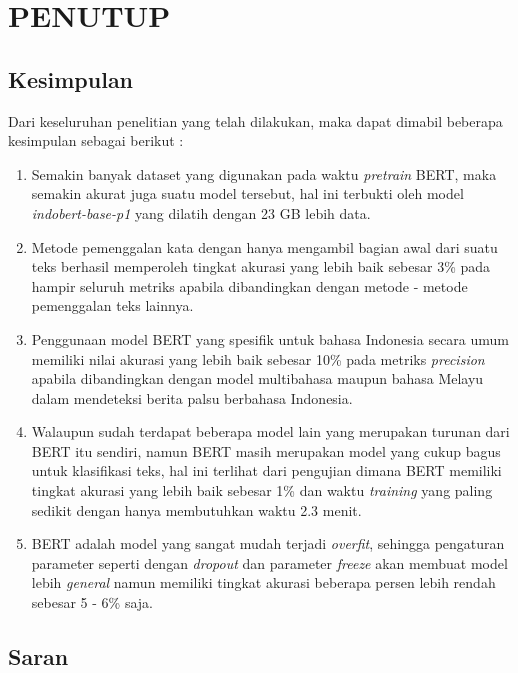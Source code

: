\chapter{PENUTUP}
\label{chap:penutup}


\section{Kesimpulan}
\label{sec:kesimpulan}

Dari keseluruhan penelitian yang telah dilakukan, maka dapat dimabil beberapa kesimpulan sebagai berikut :

\begin{enumerate}[nolistsep]

  \item Semakin banyak dataset yang digunakan pada waktu \textit{pretrain} BERT, maka semakin akurat juga suatu model tersebut, hal ini terbukti oleh model \textit{indobert-base-p1} yang dilatih dengan 23 GB lebih data.
  \item Metode pemenggalan kata dengan hanya mengambil bagian awal dari suatu teks berhasil memperoleh tingkat akurasi yang lebih baik sebesar 3\% pada hampir seluruh metriks apabila dibandingkan dengan metode - metode pemenggalan teks lainnya.
  \item Penggunaan model BERT yang spesifik untuk bahasa Indonesia secara umum memiliki nilai akurasi yang lebih baik sebesar 10\% pada metriks \textit{precision} apabila dibandingkan dengan model multibahasa maupun bahasa Melayu dalam mendeteksi berita palsu berbahasa Indonesia.
  \item Walaupun sudah terdapat beberapa model lain yang merupakan turunan dari BERT itu sendiri, namun BERT masih merupakan model yang cukup bagus untuk klasifikasi teks, hal ini terlihat dari pengujian dimana BERT memiliki tingkat akurasi yang lebih baik sebesar 1\% dan waktu \textit{training} yang paling sedikit dengan hanya membutuhkan waktu 2.3 menit.
  \item BERT adalah model yang sangat mudah terjadi \textit{overfit}, sehingga pengaturan parameter seperti dengan \textit{dropout} dan parameter \textit{freeze} akan membuat model lebih \textit{general} namun memiliki tingkat akurasi beberapa persen lebih rendah sebesar 5 - 6\% saja.

\end{enumerate}

\section{Saran}
\label{chap:saran}

